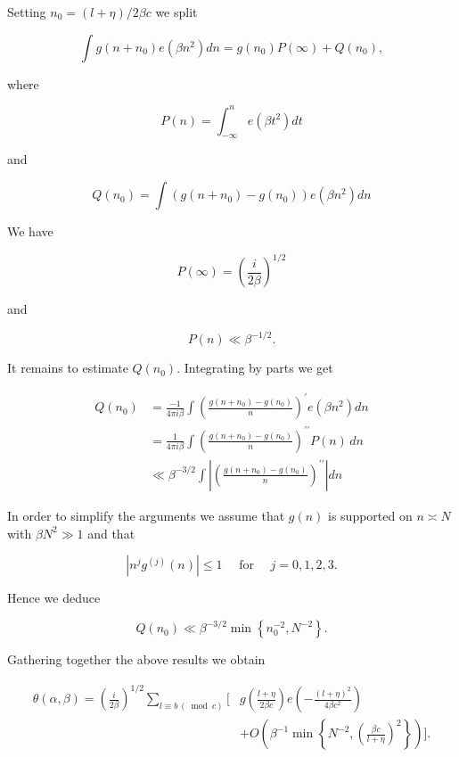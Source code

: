 \documentclass[10pt]{article}
\begin{document}
Setting $n_{0}=(l+\eta) / 2 \beta c$ we split

$$
\int g\left(n+n_{0}\right) e\left(\beta n^{2}\right) d n=g\left(n_{0}\right) P(\infty)+Q\left(n_{0}\right),
$$

where

$$
P(n)=\int_{-\infty}^{n} e\left(\beta t^{2}\right) d t
$$

and

$$
Q\left(n_{0}\right)=\int\left(g\left(n+n_{0}\right)-g\left(n_{0}\right)\right) e\left(\beta n^{2}\right) d n
$$

We have

$$
P(\infty)=\left(\frac{i}{2 \beta}\right)^{1 / 2}
$$

and

$$
P(n) \ll \beta^{-1 / 2} .
$$

It remains to estimate $Q\left(n_{0}\right)$. Integrating by parts we get

$$
\begin{aligned}
Q\left(n_{0}\right) & =\frac{-1}{4 \pi i \beta} \int\left(\frac{g\left(n+n_{0}\right)-g\left(n_{0}\right)}{n}\right)^{\prime} e\left(\beta n^{2}\right) d n \\
& =\frac{1}{4\pi i\beta}\int\left(\frac{g(n+n_{0})-g(n_{0})}{n}\right)^{\prime\prime}P(n)\,dn \\
& \ll \beta^{-3 / 2} \int\left|\left(\frac{g\left(n+n_{0}\right)-g\left(n_{0}\right)}{n}\right)^{\prime \prime}\right| d n
\end{aligned}
$$

In order to simplify the arguments we assume that $g(n)$ is supported on $n \asymp N$ with $\beta N^{2} \gg 1$ and that


\begin{equation*}
\left|n^{j} g^{(j)}(n)\right| \leqslant 1 \quad \text { for } \quad j=0,1,2,3 . \tag{9.3}
\end{equation*}


Hence we deduce

$$
Q\left(n_{0}\right) \ll \beta^{-3 / 2} \min \left\{n_{0}^{-2}, N^{-2}\right\} .
$$

Gathering together the above results we obtain

$$
\begin{aligned}
\theta(\alpha,\beta)=\left(\frac{i}{2\beta}\right)^{1/2}
\sum_{l\equiv b\, (\bmod c)}\Bigg[&g\left(\frac{l+\eta}{2\beta c}\right)
 e\left(-\frac{(l+\eta)^{2}}{4\beta c^{2}}\right)\\
&+O\left(\beta^{-1}\min\left\{N^{-2},
\left(\frac{\beta c}{l+\eta}\right)^{2}\right\}\right)\Bigg].
\end{aligned}
$$
\end{document}

